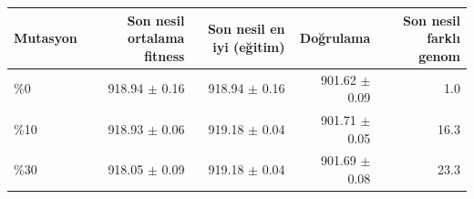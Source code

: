 \begin{tabular}{lrrrr}
\hline
Mutasyon & Son nesil ortalama fitness & Son nesil en iyi (eğitim) & Doğrulama & Son nesil farklı genom \\
\hline
\%0 & 918.94 $\pm$ 0.16 & 918.94 $\pm$ 0.16 & 901.62 $\pm$ 0.09 & 1.0 \\
\%10 & 918.93 $\pm$ 0.06 & 919.18 $\pm$ 0.04 & 901.71 $\pm$ 0.05 & 16.3 \\
\%30 & 918.05 $\pm$ 0.09 & 919.18 $\pm$ 0.04 & 901.69 $\pm$ 0.08 & 23.3 \\
\hline
\end{tabular}
